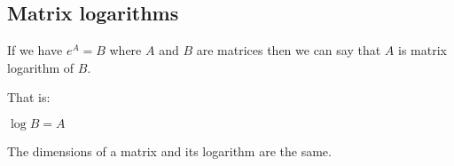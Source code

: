 
\subsection{Matrix logarithms}

If we have \(e^A=B\) where \(A\) and \(B\) are matrices then we can say that \(A\) is matrix logarithm of \(B\).

That is:

\(\log B=A\)

The dimensions of a matrix and its logarithm are the same.

